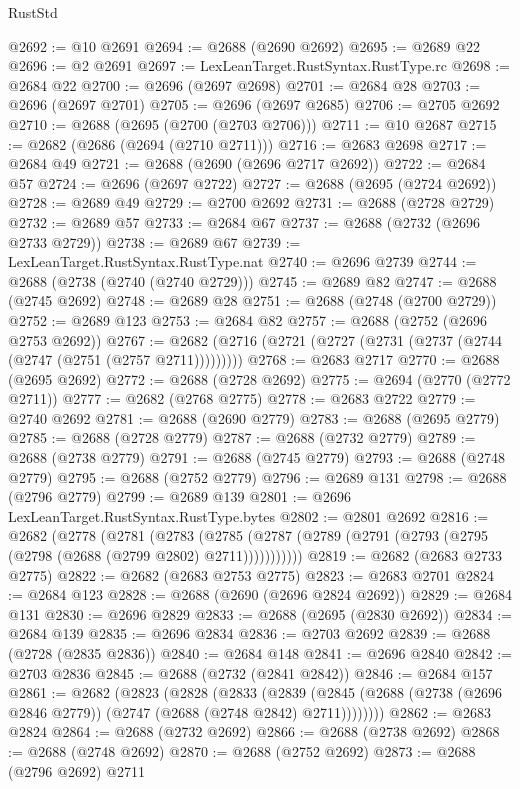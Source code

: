 \begin{lexlean}{RustStd}
\begin{coremodule}
{\begin{coremodule}
{{{{{{{{{{{{{{{{{{{{{{{{{@2692 := @10 @2691
@2694 := @2688 (@2690 @2692)
@2695 := @2689 @22
@2696 := @2 @2691
@2697 := LexLeanTarget.RustSyntax.RustType.rc
@2698 := @2684 @22
@2700 := @2696 (@2697 @2698)
@2701 := @2684 @28
@2703 := @2696 (@2697 @2701)
@2705 := @2696 (@2697 @2685)
@2706 := @2705 @2692
@2710 := @2688 (@2695 (@2700 (@2703 @2706)))
@2711 := @10 @2687
@2715 := @2682 (@2686 (@2694 (@2710 @2711)))
@2716 := @2683 @2698
@2717 := @2684 @49
@2721 := @2688 (@2690 (@2696 @2717 @2692))
@2722 := @2684 @57
@2724 := @2696 (@2697 @2722)
@2727 := @2688 (@2695 (@2724 @2692))
@2728 := @2689 @49
@2729 := @2700 @2692
@2731 := @2688 (@2728 @2729)
@2732 := @2689 @57
@2733 := @2684 @67
@2737 := @2688 (@2732 (@2696 @2733 @2729))
@2738 := @2689 @67
@2739 := LexLeanTarget.RustSyntax.RustType.nat
@2740 := @2696 @2739
@2744 := @2688 (@2738 (@2740 (@2740 @2729)))
@2745 := @2689 @82
@2747 := @2688 (@2745 @2692)
@2748 := @2689 @28
@2751 := @2688 (@2748 (@2700 @2729))
@2752 := @2689 @123
@2753 := @2684 @82
@2757 := @2688 (@2752 (@2696 @2753 @2692))
@2767 := @2682 (@2716 (@2721 (@2727 (@2731 (@2737 (@2744 (@2747 (@2751 (@2757 @2711)))))))))
@2768 := @2683 @2717
@2770 := @2688 (@2695 @2692)
@2772 := @2688 (@2728 @2692)
@2775 := @2694 (@2770 (@2772 @2711))
@2777 := @2682 (@2768 @2775)
@2778 := @2683 @2722
@2779 := @2740 @2692
@2781 := @2688 (@2690 @2779)
@2783 := @2688 (@2695 @2779)
@2785 := @2688 (@2728 @2779)
@2787 := @2688 (@2732 @2779)
@2789 := @2688 (@2738 @2779)
@2791 := @2688 (@2745 @2779)
@2793 := @2688 (@2748 @2779)
@2795 := @2688 (@2752 @2779)
@2796 := @2689 @131
@2798 := @2688 (@2796 @2779)
@2799 := @2689 @139
@2801 := @2696 LexLeanTarget.RustSyntax.RustType.bytes
@2802 := @2801 @2692
@2816 := @2682
    (@2778
      (@2781
        (@2783
          (@2785 (@2787 (@2789 (@2791 (@2793 (@2795 (@2798 (@2688 (@2799 @2802) @2711)))))))))))
@2819 := @2682 (@2683 @2733 @2775)
@2822 := @2682 (@2683 @2753 @2775)
@2823 := @2683 @2701
@2824 := @2684 @123
@2828 := @2688 (@2690 (@2696 @2824 @2692))
@2829 := @2684 @131
@2830 := @2696 @2829
@2833 := @2688 (@2695 (@2830 @2692))
@2834 := @2684 @139
@2835 := @2696 @2834
@2836 := @2703 @2692
@2839 := @2688 (@2728 (@2835 @2836))
@2840 := @2684 @148
@2841 := @2696 @2840
@2842 := @2703 @2836
@2845 := @2688 (@2732 (@2841 @2842))
@2846 := @2684 @157
@2861 := @2682
    (@2823
      (@2828
        (@2833
          (@2839 (@2845 (@2688 (@2738 (@2696 @2846 @2779)) (@2747 (@2688 (@2748 @2842) @2711))))))))
@2862 := @2683 @2824
@2864 := @2688 (@2732 @2692)
@2866 := @2688 (@2738 @2692)
@2868 := @2688 (@2748 @2692)
@2870 := @2688 (@2752 @2692)
@2873 := @2688 (@2796 @2692) @2711
}}}}}}}}}}}}}}}}}}}}}}}}}
\end{coremodule}}
\end{coremodule}
\end{lexlean}
